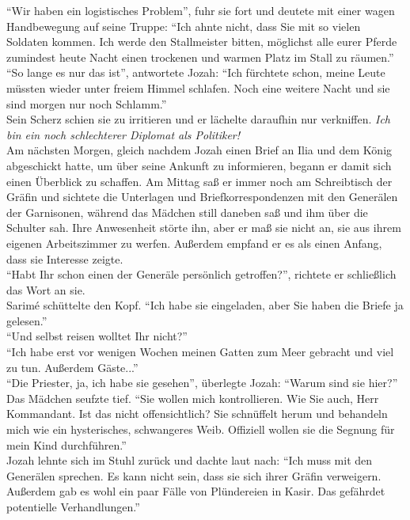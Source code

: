 ``Wir haben ein logistisches Problem'', fuhr sie fort und deutete mit einer wagen Handbewegung auf 
seine Truppe: ``Ich ahnte nicht, dass Sie mit so vielen Soldaten kommen. Ich werde den Stallmeister 
bitten, möglichst alle eurer Pferde zumindest heute Nacht einen trockenen und warmen Platz im Stall 
zu räumen.''\\
``So lange es nur das ist'', antwortete Jozah: ``Ich fürchtete schon, meine Leute müssten wieder 
unter freiem Himmel schlafen. Noch eine weitere Nacht und sie sind morgen nur noch Schlamm.''\\
Sein Scherz schien sie zu irritieren und er lächelte daraufhin nur verkniffen. \textit{Ich bin ein 
noch schlechterer Diplomat als Politiker!}\\

Am nächsten Morgen, gleich nachdem Jozah einen Brief an Ilia und dem König abgeschickt hatte, um 
über seine Ankunft zu informieren, begann er damit sich einen Überblick zu schaffen. Am Mittag saß 
er immer noch am Schreibtisch der Gräfin und sichtete die Unterlagen und Briefkorrespondenzen mit 
den Generälen der Garnisonen, während das Mädchen still daneben saß und ihm über die Schulter sah. 
Ihre Anwesenheit störte ihn, aber er maß sie nicht an, sie aus ihrem eigenen Arbeitszimmer zu 
werfen. Außerdem empfand er es als einen Anfang, dass sie Interesse zeigte.\\
``Habt Ihr schon einen der Generäle persönlich getroffen?'', richtete er schließlich das Wort an 
sie.\\
Sarimé schüttelte den Kopf. ``Ich habe sie eingeladen, aber Sie haben die Briefe ja gelesen.''\\
``Und selbst reisen wolltet Ihr nicht?''\\
``Ich habe erst vor wenigen Wochen meinen Gatten zum Meer gebracht und viel zu tun. Außerdem 
Gäste...''\\
``Die Priester, ja, ich habe sie gesehen'', überlegte Jozah: ``Warum sind sie hier?''\\
Das Mädchen seufzte tief. ``Sie wollen mich kontrollieren. Wie Sie auch, Herr Kommandant. Ist das 
nicht offensichtlich? Sie schnüffelt herum und behandeln mich wie ein hysterisches, schwangeres 
Weib. Offiziell wollen sie die Segnung für mein Kind durchführen.''\\
Jozah lehnte sich im Stuhl zurück und dachte laut nach: ``Ich muss mit den Generälen sprechen. Es 
kann nicht sein, dass sie sich ihrer Gräfin verweigern. Außerdem gab es wohl ein paar Fälle von 
Plündereien in Kasir. Das gefährdet potentielle Verhandlungen.''\\
